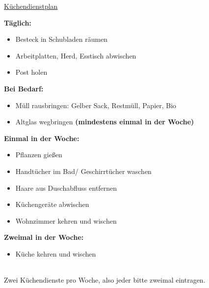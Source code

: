 


	
\pagestyle{empty}
{\Large\underline{Küchendienstplan}}
\newline

\raggedright
\begin{minipage}{8cm}
	\textbf{Täglich:}
	\begin{itemize}
		\item Besteck in Schubladen räumen
		\item Arbeitplatten, Herd, Esstisch abwischen
		\item Post holen
	\end{itemize}

	\textbf{Bei Bedarf:}
	\begin{itemize}
		\item Müll rausbringen: Gelber Sack, Restmüll, Papier, Bio
		\item Altglas wegbringen \textbf{(mindestens einmal in der Woche)}
	\end{itemize}
\end{minipage}
\raggedright
\begin{minipage}{8cm}
	\textbf{Einmal in der Woche:}
	\begin{itemize}
		\item Pflanzen gießen
		\item Handtücher im Bad/ Geschirrtücher waschen
		\item Haare aus Duschabfluss entfernen
		\item Küchengeräte abwischen
		\item Wohnzimmer kehren und wischen
	\end{itemize}
		\textbf{Zweimal in der Woche:}
	\begin{itemize}
		\item Küche kehren und wischen
	\end{itemize}
\end{minipage}
\vspace{2cm}

\\
Zwei Küchendienste pro Woche, also jeder bitte zweimal eintragen.

